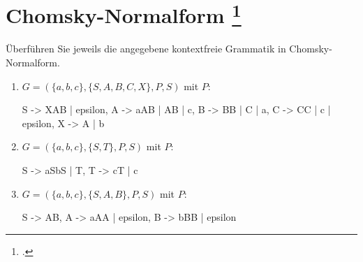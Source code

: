 \documentclass{lehramt-informatik-aufgabe}
\begin{document}
\section{Chomsky-Normalform
\footcite{theo:ab:2}}

Überführen Sie jeweils die angegebene kontextfreie Grammatik in
Chomsky-Normalform.

\begin{enumerate}
\item $G = (\{a, b, c\}, \{S, A, B, C, X\}, P, S)$ mit $P$:

\begin{liProduktionsRegeln}
S -> XAB | epsilon,
A -> aAB | AB | c,
B -> BB | C | a,
C -> CC | c | epsilon,
X -> A | b
\end{liProduktionsRegeln}

\item $G = (\{a, b, c\}, \{S, T\}, P, S)$ mit $P$:

\begin{liProduktionsRegeln}
S -> aSbS | T,
T -> cT | c
\end{liProduktionsRegeln}

\item $G = (\{a, b, c\}, \{S, A, B\}, P, S)$ mit $P$:

\begin{liProduktionsRegeln}
S -> AB,
A -> aAA | epsilon,
B -> bBB | epsilon
\end{liProduktionsRegeln}
\end{enumerate}
\end{document}
